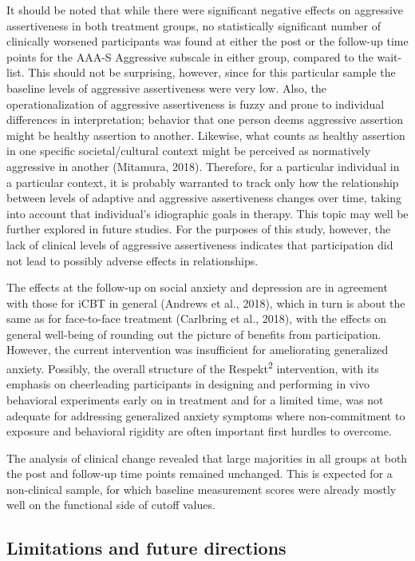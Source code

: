 \documentclass[3p]{elsarticle} %
\begin{document}
It should be noted that while there were significant negative effects on
aggressive assertiveness in both treatment groups, no statistically
significant number of clinically worsened participants was found at
either the post or the follow-up time points for the AAA-S Aggressive
subscale in either group, compared to the wait-list. This should not be
surprising, however, since for this particular sample the baseline
levels of aggressive assertiveness were very low. Also, the
operationalization of aggressive assertiveness is fuzzy and prone to
individual differences in interpretation; behavior that one person deems
aggressive assertion might be healthy assertion to another. Likewise,
what counts as healthy assertion in one specific societal/cultural
context might be perceived as normatively aggressive in another
(Mitamura, 2018). Therefore, for a particular individual in a particular
context, it is probably warranted to track only how the relationship
between levels of adaptive and aggressive assertiveness changes over
time, taking into account that individual's idiographic goals in
therapy. This topic may well be further explored in future studies. For
the purposes of this study, however, the lack of clinical levels of
aggressive assertiveness indicates that participation did not lead to
possibly adverse effects in relationships.

The effects at the follow-up on social anxiety and depression are in
agreement with those for iCBT in general (Andrews et al., 2018), which
in turn is about the same as for face-to-face treatment (Carlbring et
al., 2018), with the effects on general well-being of rounding out the
picture of benefits from participation. However, the current
intervention was insufficient for ameliorating generalized anxiety.
Possibly, the overall structure of the Respekt\textsuperscript{2}
intervention, with its emphasis on cheerleading participants in
designing and performing in vivo behavioral experiments early on in
treatment and for a limited time, was not adequate for addressing
generalized anxiety symptoms where non-commitment to exposure and
behavioral rigidity are often important first hurdles to overcome.

\color{newtext}The analysis of clinical change revealed that large
majorities in all groups at both the post and follow-up time points
remained unchanged. This is expected for a non-clinical sample, for
which baseline measurement scores were already mostly well on the
functional side of cutoff values.\color{oldtext}

\hypertarget{limitations-and-future-directions}{%
\subsection{Limitations and future
directions}\label{limitations-and-future-directions}}
\end{document}
